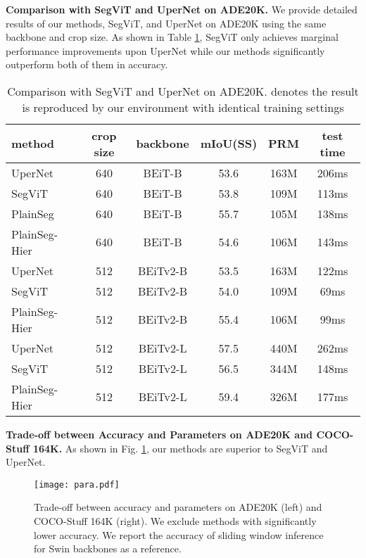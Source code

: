 \documentclass{article} \usepackage{iclr2024_conference,times}
\begin{document}
\textbf{Comparison with SegViT and UperNet on ADE20K.} We provide detailed results of our methods, SegViT, and UperNet on ADE20K using the same backbone and crop size. As shown in Table \ref{tab:12}, SegViT only achieves marginal performance improvements upon UperNet while our methods significantly outperform both of them in accuracy.

\begin{table}[h]
\caption{Comparison with SegViT \cite{zhang2022segvit} and UperNet on ADE20K.  denotes the result is reproduced by our environment with identical training settings}
\begin{center}
\label{tab:12}
\begin{tabular}{l|ccccc}
\toprule
method & crop size & backbone   &mIoU(SS)  & PRM &test time \\\midrule
UperNet & 640  &BEiT-B &53.6 &163M &206ms \\
SegViT & 640  &BEiT-B &53.8 &109M &113ms \\
PlainSeg & 640 &BEiT-B & 55.7 &105M &138ms \\
PlainSeg-Hier & 640 &BEiT-B & 54.6 &106M &143ms \\\midrule
UperNet & 512  &BEiTv2-B &53.5 &163M &122ms \\
SegViT & 512  &BEiTv2-B &54.0 &109M &69ms \\
PlainSeg-Hier & 512 &BEiTv2-B & 55.4 &106M &99ms \\\midrule
UperNet & 512  &BEiTv2-L &57.5 &440M &262ms \\
SegViT & 512   &BEiTv2-L &56.5 &344M &148ms \\
PlainSeg-Hier & 512 &BEiTv2-L & 59.4 &326M &177ms \\
\bottomrule
\end{tabular}
\end{center}
\end{table}

\textbf{Trade-off between Accuracy and Parameters on ADE20K and COCO-Stuff 164K.} As shown in Fig. \ref{fig4}, our methods are superior to SegViT and UperNet.


\begin{figure}
  \centerline{\texttt{[image: para.pdf]}}
  \caption{Trade-off between accuracy and parameters on ADE20K (left) and COCO-Stuff 164K (right). We exclude methods with significantly lower accuracy. We report the accuracy of sliding window inference for Swin backbones as a reference.}
  \label{fig4}
\end{figure}
\end{document}
